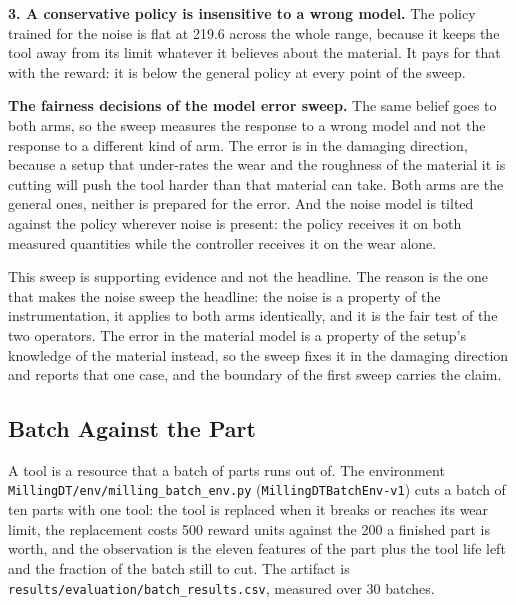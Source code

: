 \documentclass[11pt,a4paper]{article}
\begin{document}
\textbf{3. A conservative policy is insensitive to a wrong model.} The policy trained for the noise is flat at 219.6 across the whole range, because it keeps the tool away from its limit whatever it believes about the material. It pays for that with the reward: it is below the general policy at every point of the sweep.

\textbf{The fairness decisions of the model error sweep.} The same belief goes to both arms, so the sweep measures the response to a wrong model and not the response to a different kind of arm. The error is in the damaging direction, because a setup that under-rates the wear and the roughness of the material it is cutting will push the tool harder than that material can take. Both arms are the general ones, neither is prepared for the error. And the noise model is tilted against the policy wherever noise is present: the policy receives it on both measured quantities while the controller receives it on the wear alone.

This sweep is supporting evidence and not the headline. The reason is the one that makes the noise sweep the headline: the noise is a property of the instrumentation, it applies to both arms identically, and it is the fair test of the two operators. The error in the material model is a property of the setup's knowledge of the material instead, so the sweep fixes it in the damaging direction and reports that one case, and the boundary of the first sweep carries the claim.

\subsection{Batch Against the Part}
\label{sec:batch}

A tool is a resource that a batch of parts runs out of. The environment \texttt{MillingDT/\allowbreak env/\allowbreak milling\_batch\_env.py} (\texttt{MillingDTBatchEnv-v1}) cuts a batch of ten parts with one tool: the tool is replaced when it breaks or reaches its wear limit, the replacement costs 500 reward units against the 200 a finished part is worth, and the observation is the eleven features of the part plus the tool life left and the fraction of the batch still to cut. The artifact is \texttt{results/\allowbreak evaluation/\allowbreak batch\_results.csv}, measured over 30 batches.
\end{document}
